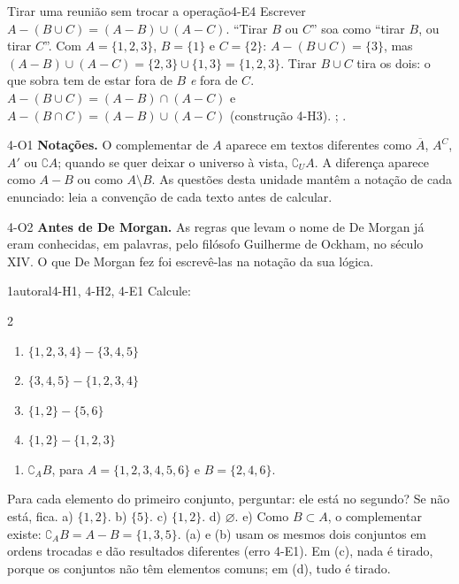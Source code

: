 \begin{erro}{Tirar uma reunião sem trocar a operação}{4-E4}
 Escrever $A-(B\cup C)=(A-B)\cup(A-C)$.
 \enquote{Tirar $B$ ou $C$} soa como \enquote{tirar $B$, ou tirar $C$}.
 Com $A=\{1,2,3\}$, $B=\{1\}$ e $C=\{2\}$: $A-(B\cup C)=\{3\}$, mas $(A-B)\cup(A-C)=\{2,3\}\cup\{1,3\}=\{1,2,3\}$.
 Tirar $B\cup C$ tira os dois: o que sobra tem de estar fora de $B$ \emph{e} fora de $C$.
 $A-(B\cup C)=(A-B)\cap(A-C)$ e $A-(B\cap C)=(A-B)\cup(A-C)$ (construção 4-H3).
 ; .
\end{erro}

\Observacoes

\begin{obs}{4-O1}
\textbf{Notações.} O complementar de $A$ aparece em textos diferentes como $\overline{A}$, $A^{C}$, $A'$ ou $\complement A$; quando se quer deixar o universo à vista, $\complement_U A$. A diferença aparece como $A-B$ ou como $A\setminus B$. As questões desta unidade mantêm a notação de cada enunciado: leia a convenção de cada texto antes de calcular.
\end{obs}

\begin{obs}{4-O2}
\textbf{Antes de De Morgan.} As regras que levam o nome de De Morgan já eram conhecidas, em palavras, pelo filósofo Guilherme de Ockham, no século XIV. O que De Morgan fez foi escrevê-las na notação da sua lógica.
\end{obs}

\Exemplos

\begin{exemplo}{}{1}{autoral}{4-H1, 4-H2, 4-E1}
\label{ex:u4:calcular}
Calcule:
\begin{multicols}{2}
\begin{enumerate}[label=\alph*)]
  \item $\{1,2,3,4\}-\{3,4,5\}$
  \item $\{3,4,5\}-\{1,2,3,4\}$
  \item $\{1,2\}-\{5,6\}$
  \item $\{1,2\}-\{1,2,3\}$
\end{enumerate}
\end{multicols}
\begin{enumerate}[label=\alph*),start=5]
  \item $\complement_A B$, para $A=\{1,2,3,4,5,6\}$ e $B=\{2,4,6\}$.
\end{enumerate}
\plano Para cada elemento do primeiro conjunto, perguntar: ele está no segundo? Se não está, fica.
\resolucao a) $\{1,2\}$. b) $\{5\}$. c) $\{1,2\}$. d) $\varnothing$. e) Como $B\subset A$, o complementar existe: $\complement_A B=A-B=\{1,3,5\}$.
\comentario (a) e (b) usam os mesmos dois conjuntos em ordens trocadas e dão resultados diferentes (erro 4-E1). Em (c), nada é tirado, porque os conjuntos não têm elementos comuns; em (d), tudo é tirado.
\end{exemplo}

